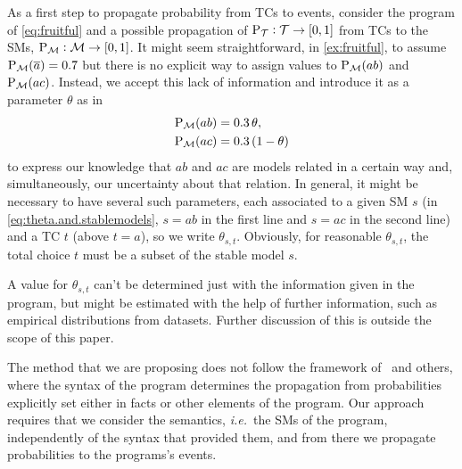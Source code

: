 \documentclass[x11names]{tlp}
\renewcommand{\cite}{\citep}
\begin{document}
As a first step to propagate probability from \aclp{TC} to events, consider
the program of \cref{eq:fruitful} and a possible propagation of
$\prT:\TCHOICEset \to \intcc{0,1}$ from \aclp{TC} to the \aclp{SM},
$\prM:\MODELset \to \intcc{0,1}$. It might seem straightforward, in
\cref{ex:fruitful}, to assume $\prM\at{\co{a}}=0.7$ but there is no explicit
way to assign values to $\prM\at{ab}$ and $\prM\at{ac}$. Instead, we accept
this lack of information and introduce it as a parameter $\theta$ as in
\begin{equation}
	\begin{aligned}
		\prM\at{ab} & = 0.3\, \theta,
		\\
		\prM\at{ac} & = 0.3\, (1 - \theta)
	\end{aligned}\label{eq:theta.and.stablemodels}
\end{equation}
to express our knowledge that $ab$ and $ac$ are models related in a
certain way and, simultaneously, our uncertainty about that relation.
In general, it might be necessary to have several such parameters, each
associated to a given \acl{SM} $s$ (in \cref{eq:theta.and.stablemodels}, $s = ab$ in the first line and $s = ac$ in the second line)
and a \acl{TC} $t$ (above $t=a$), so we write
$\theta_{s,t}$.
Obviously, for reasonable $\theta_{s,t}$,
the total choice $t$ must be a subset of
the stable model $s$.

A value for $\theta_{s,t}$ can't be determined just with the information
given in the program, but might be estimated with the help of further
information, such as empirical distributions from datasets. Further
discussion of this is outside the scope of this paper.

The method that we are proposing does not follow the framework
of~\cite{kifer1992theory} and others, where the syntax of the program
determines the propagation from probabilities explicitly set either in facts
or other elements of the program. Our approach requires that we consider the
semantics, \emph{i.e.}\ the \aclp{SM} of the program, independently of the
syntax that provided them, and from there we propagate probabilities to the
programs's events.
\end{document}
